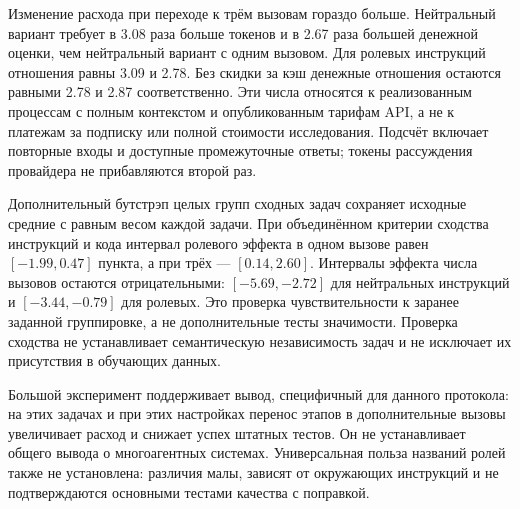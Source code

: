 Изменение расхода при переходе к трём вызовам гораздо больше. Нейтральный вариант требует в 3.08 раза больше токенов и в 2.67 раза большей денежной оценки, чем нейтральный вариант с одним вызовом. Для ролевых инструкций отношения равны 3.09 и 2.78. Без скидки за кэш денежные отношения остаются равными 2.78 и 2.87 соответственно. Эти числа относятся к реализованным процессам с полным контекстом и опубликованным тарифам API, а не к платежам за подписку или полной стоимости исследования. Подсчёт включает повторные входы и доступные промежуточные ответы; токены рассуждения провайдера не прибавляются второй раз.

Дополнительный бутстрэп целых групп сходных задач сохраняет исходные средние с равным весом каждой задачи. При объединённом критерии сходства инструкций и кода интервал ролевого эффекта в одном вызове равен $[-1.99,0.47]$ пункта, а при трёх --- $[0.14,2.60]$. Интервалы эффекта числа вызовов остаются отрицательными: $[-5.69,-2.72]$ для нейтральных инструкций и $[-3.44,-0.79]$ для ролевых. Это проверка чувствительности к заранее заданной группировке, а не дополнительные тесты значимости. Проверка сходства не устанавливает семантическую независимость задач и не исключает их присутствия в обучающих данных.

Большой эксперимент поддерживает вывод, специфичный для данного протокола: на этих задачах и при этих настройках перенос этапов в дополнительные вызовы увеличивает расход и снижает успех штатных тестов. Он не устанавливает общего вывода о многоагентных системах. Универсальная польза названий ролей также не установлена: различия малы, зависят от окружающих инструкций и не подтверждаются основными тестами качества с поправкой.
